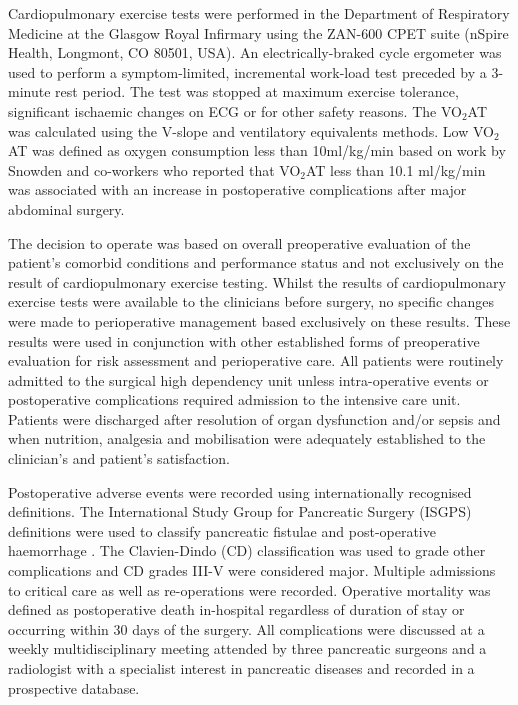 Cardiopulmonary exercise tests were performed in the Department of Respiratory Medicine at the Glasgow Royal Infirmary using the ZAN-600 CPET suite (nSpire Health, Longmont, CO 80501, USA). An electrically-braked cycle ergometer was used to perform a symptom-limited, incremental work-load test preceded by a 3-minute rest period. The test was stopped at maximum exercise tolerance, significant ischaemic changes on ECG or for other safety reasons. The VO$_2$AT was calculated using the V-slope \parencite{beaver_new_1986, sue_metabolic_1988} and ventilatory equivalents \parencite{sue_metabolic_1988} methods. Low VO$_2$AT was defined as oxygen consumption less than 10ml/kg/min based on work by Snowden and co-workers \parencite{snowden_submaximal_2010} who reported that VO$_2$AT less than 10.1 ml/kg/min was associated with an increase in postoperative complications after major abdominal surgery.

The decision to operate was based on overall preoperative evaluation of the patient’s comorbid conditions and performance status and not exclusively on the result of cardiopulmonary exercise testing. Whilst the results of cardiopulmonary exercise tests were available to the clinicians before surgery, no specific changes were made to perioperative management based exclusively on these results. These results were used in conjunction with other established forms of preoperative evaluation for risk assessment and perioperative care. All patients were routinely admitted to the surgical high dependency unit unless intra-operative events or postoperative complications required admission to the intensive care unit. Patients were discharged after resolution of organ dysfunction and/or sepsis and when nutrition, analgesia and mobilisation were adequately established to the clinician's and patient's satisfaction.

Postoperative adverse events were recorded using internationally recognised definitions. The International Study Group for Pancreatic Surgery (ISGPS) definitions were used to classify pancreatic fistulae \parencite{bassi_postoperative_2005} and post-operative haemorrhage \parencite{wente_postpancreatectomy_2007}. The Clavien-Dindo (CD) classification \parencite{clavien_clavien-dindo_2009, dindo_classification_2004} was used to grade other complications and CD grades III-V were considered major. Multiple admissions to critical care as well as re-operations were recorded. Operative mortality was defined as postoperative death in-hospital regardless of duration of stay or occurring within 30 days of the surgery. All complications were discussed at a weekly multidisciplinary meeting attended by three pancreatic surgeons and a radiologist with a specialist interest in pancreatic diseases and recorded in a prospective database.

